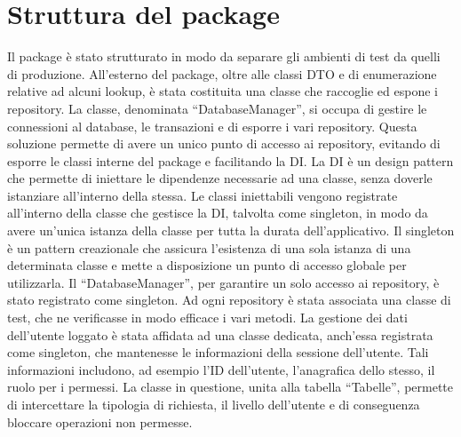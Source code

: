 \section{Struttura del package}
Il package è stato strutturato in modo da separare gli ambienti di test da quelli di produzione.
All'esterno del package, oltre alle classi \ac{DTO} e di enumerazione relative ad alcuni lookup, è
stata costituita una classe che raccoglie ed espone i repository.
La classe, denominata ``DatabaseManager'', si occupa di gestire le connessioni al database,
le transazioni e di esporre i vari repository.
Questa soluzione permette di avere un unico punto di accesso ai repository,
evitando di esporre le classi interne del package e facilitando la \ac{DI}.
La \ac{DI} è un design pattern che permette di iniettare le dipendenze necessarie ad una classe,
senza doverle istanziare all'interno della stessa.
Le classi iniettabili vengono registrate all'interno della classe che gestisce la \ac{DI}, talvolta come singleton,
in modo da avere un'unica istanza della classe per tutta la durata dell'applicativo.
Il singleton è un pattern creazionale che assicura l'esistenza di
una sola istanza di una determinata classe e mette a disposizione
un punto di accesso globale per utilizzarla.
Il ``DatabaseManager'', per garantire un solo accesso ai repository, è stato registrato come singleton.
Ad ogni repository è stata associata una classe di test, che ne verificasse in modo efficace i vari metodi.
La gestione dei dati dell'utente loggato è stata affidata ad una classe dedicata, anch'essa
registrata come singleton, che mantenesse le informazioni della sessione dell'utente.
Tali informazioni includono, ad esempio l'\ac{ID} dell'utente, l'anagrafica dello stesso, il ruolo per i permessi.
La classe in questione, unita alla tabella ``Tabelle'',
permette di intercettare la tipologia di richiesta, il livello dell'utente e
di conseguenza bloccare operazioni non permesse.

